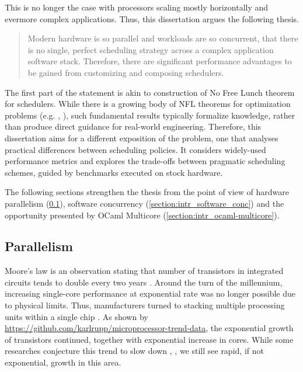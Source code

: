 \documentclass[12pt,a4paper,twoside]{report}
\begin{document}
This is no longer the case with processors scaling mostly horizontally and evermore complex applications. Thus, this dissertation argues the following thesis. 

\begin{quote}
    Modern hardware is so parallel and workloads are so concurrent, that there is no single, perfect scheduling strategy across a complex application software stack. Therefore, there are significant performance advantages to be gained from customizing and composing schedulers.
\end{quote} 

The first part of the statement is akin to construction of No Free Lunch theorem \cite{Ho2002} for schedulers. While there is a growing body of NFL theorems for optimization problems (e.g. \cite{Wolpert1997}, \cite{Igel2005}), such fundamental results typically formalize knowledge, rather than produce direct guidance for real-world engineering. Therefore, this dissertation aims for a different exposition of the problem, one that analyses practical differences between scheduling policies. It considers widely-used performance metrics and explores the trade-offs between pragmatic scheduling schemes, guided by benchmarks executed on stock hardware. 

The following sections strengthen the thesis from the point of view of hardware parallelism (\ref{section:intr_hardware_par}), software concurrency (\ref{section:intr_software_conc}) and the opportunity presented by OCaml Multicore (\ref{section:intr_ocaml-multicore}).

\subsection{Parallelism}
\label{section:intr_hardware_par}

Moore's law is an observation stating that number of transistors in integrated circuits tends to double every two years \cite{Moore2006}. Around the turn of the millennium, increasing single-core performance at exponential rate was no longer possible due to physical limits. Thus, manufacturers turned to stacking multiple processing units within a single chip \cite{Geer2005}. As shown by  \url{https://github.com/karlrupp/microprocessor-trend-data}, the exponential growth of transistors continued, together with exponential increase in cores. While some researches conjecture this trend to slow down \cite{6307773}, \cite{mooremulti}, we still see rapid, if not exponential, growth in this area.
\end{document}
